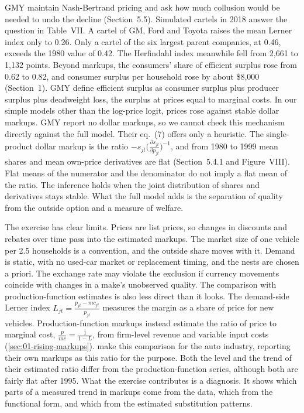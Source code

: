 GMY maintain Nash-Bertrand pricing and ask how much collusion would be needed to undo the decline (Section~5.5).
Simulated cartels in 2018 answer the question in Table~VII. A cartel of GM, Ford and Toyota raises the mean Lerner index
only to 0.26. Only a cartel of the six largest parent companies, at 0.46, exceeds the 1980 value of 0.42. The
Herfindahl index meanwhile fell from 2,661 to 1,132 points. Beyond markups, the consumers' share of efficient surplus
rose from 0.62 to 0.82, and consumer surplus per household rose by about \$8,000 (Section~1). GMY define efficient
surplus as consumer surplus plus producer surplus plus deadweight loss, the surplus at prices equal to marginal costs.
In our simple models other than the log-price logit, prices rose against stable dollar markups. GMY report no dollar markups, so we cannot check
this mechanism directly against the full model. Their eq.~(7) offers only a heuristic. The single-product dollar markup
is the ratio $-s_{jt}\big(\frac{\partial s_{jt}}{\partial p_{jt}}\big)^{-1}$, and from 1980 to 1999 mean shares and mean
own-price derivatives are flat (Section~5.4.1 and Figure~VIII). Flat means of the numerator and the denominator do not
imply a flat mean of the ratio. The inference holds when the joint distribution of shares and derivatives
stays stable. What the full model adds is the separation of quality from the outside option and a measure of welfare.

The exercise has clear limits. Prices are list prices, so changes in discounts and rebates over time pass into the
estimated markups. The market size of one vehicle per 2.5 households is a convention, and the outside share moves with
it. Demand is static, with no used-car market or replacement timing, and the nests are chosen a priori. The exchange
rate may violate the exclusion if currency movements coincide with changes in a make's unobserved quality. The
comparison with production-function estimates is also less direct than it looks. The demand-side Lerner index
$L_{jt} = \frac{p_{jt} - mc_{jt}}{p_{jt}}$ measures the margin as a share of price for new vehicles. Production-function
markups instead estimate the ratio of price to marginal cost, $\frac{p}{mc} = \frac{1}{1 - L}$, from firm-level revenue
and variable input costs (\cref{sec:01-rising-markups}). \citet[Section~5.6]{GriecoMurryYurukoglu2024} make this
comparison for the auto industry, reporting their own markups as this ratio for the purpose. Both the level and the
trend of their estimated ratio differ from the production-function series, although both are fairly flat after 1995.
What the exercise contributes is a diagnosis. It shows which parts of a measured trend in markups come from the data, which from the functional form, and which from the estimated
substitution patterns.


